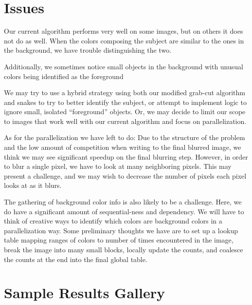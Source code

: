 \documentclass[12pt]{article}
\begin{document}
\section*{Issues}

Our current algorithm performs very well on some images, but on others it does
not do as well. When the colors composing the subject are similar to the ones
in the background, we have trouble distinguishing the two.

Additionally, we sometimes notice small objects in the background with unusual
colors being identified as the foreground

We may try to use a hybrid strategy using both our modified grab-cut algorithm
and snakes to try to better identify the subject, or attempt to implement logic
to ignore small, isolated ``foreground'' objects. Or, we may decide to limit
our scope to images that work well with our current algorithm and focus on
parallelization.

As for the parallelization we have left to do: Due to the structure of the
problem and the low amount of competition when writing to the final blurred
image, we think we may see significant speedup on the final blurring step.
However, in order to blur a single pixel, we have to look at many neighboring
pixels. This may present a challenge, and we may wish to decrease the number of
pixels each pixel looks at as it blurs.

The gathering of background color info is also likely to be a challenge. Here,
we do have a significant amount of sequential-ness and dependency. We will have
to think of creative ways to identify which colors are background colors in a
parallelization way. Some preliminary thoughts we have are to set up a lookup
table mapping ranges of colors to number of times encountered in the image,
break the image into many small blocks, locally update the counts, and coalesce
the counts at the end into the final global table.

\section*{Sample Results Gallery}
\end{document}
